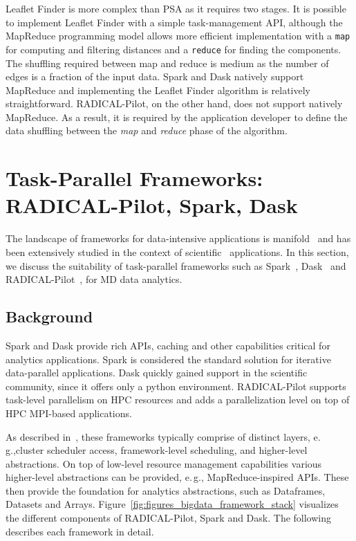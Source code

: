 Leaflet Finder is more complex than PSA as it requires two stages.
It is possible to implement Leaflet Finder with a simple task-management API, although the MapReduce programming model allows more efficient implementation with a \texttt{map} for computing and filtering distances and a \texttt{reduce} for finding the components.
The shuffling required between map and reduce is medium as the number of edges is a fraction of the input data.
Spark and Dask natively support MapReduce and implementing the Leaflet Finder algorithm is relatively straightforward.
RADICAL-Pilot, on the other hand, does not support natively MapReduce.
As a result, it is required by the application developer to define the data shuffling between the \emph{map} and \emph{reduce} phase of the algorithm.

\section{Task-Parallel Frameworks: RADICAL-Pilot, Spark, Dask}
\label{sec:frameworks}
The landscape of frameworks for data-intensive applications is manifold~\cite{jha2014tale,kamburugamuve2017anatomy} and has been extensively studied in the context of scientific~\cite{jha2017introducing} applications.
In this section, we discuss the suitability of task-parallel frameworks such as Spark~\cite{zaharia2010spark}, Dask~\cite{rocklin2015dask} and RADICAL-Pilot~\cite{merzky2019using}, for MD data analytics.

\subsection{Background}
Spark and Dask provide rich APIs, caching and other capabilities critical for analytics applications.
Spark is considered the standard solution for iterative data-parallel applications.
Dask quickly gained support in the scientific community, since it offers only a python environment.
RADICAL-Pilot supports task-level parallelism on HPC resources and adds a parallelization level on top of HPC MPI-based applications.

As described in~\cite{jha2014tale}, these frameworks typically comprise of distinct layers, e.\,g.,cluster scheduler access, framework-level scheduling, and higher-level abstractions.
On top of low-level resource management capabilities various higher-level abstractions can be provided, e.\,g., MapReduce-inspired APIs.
These then provide the foundation for analytics abstractions, such as Dataframes, Datasets and Arrays.
Figure~\ref{fig:figures_bigdata_framework_stack} visualizes the different components of RADICAL-Pilot, Spark and Dask.
The following describes each framework in detail.

